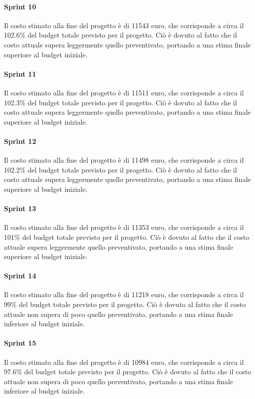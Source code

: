 \paragraph{Sprint 10}
Il costo stimato alla fine del progetto è di 11543 euro, che corrisponde a circa il 102.6\% del budget totale previsto per il progetto.
Ciò è dovuto al fatto che il costo attuale supera leggermente quello preventivato, portando a una stima finale superiore al budget iniziale.

\paragraph{Sprint 11}
Il costo stimato alla fine del progetto è di 11511 euro, che corrisponde a circa il 102.3\% del budget totale previsto per il progetto.
Ciò è dovuto al fatto che il costo attuale supera leggermente quello preventivato, portando a una stima finale superiore al budget iniziale.

\paragraph{Sprint 12}
Il costo stimato alla fine del progetto è di 11498 euro, che corrisponde a circa il 102.2\% del budget totale previsto per il progetto.
Ciò è dovuto al fatto che il costo attuale supera leggermente quello preventivato, portando a una stima finale superiore al budget iniziale.

\paragraph{Sprint 13}
Il costo stimato alla fine del progetto è di 11353 euro, che corrisponde a circa il 101\% del budget totale previsto per il progetto.
Ciò è dovuto al fatto che il costo attuale supera leggermente quello preventivato, portando a una stima finale superiore al budget iniziale.

\paragraph{Sprint 14}
Il costo stimato alla fine del progetto è di 11218 euro, che corrisponde a circa il 99\% del budget totale previsto per il progetto.
Ciò è dovuto al fatto che il costo attuale non supera di poco quello preventivato, portando a una stima finale inferiore al budget iniziale.

\paragraph{Sprint 15}
Il costo stimato alla fine del progetto è di 10984 euro, che corrisponde a circa il 97.6\% del budget totale previsto per il progetto.
Ciò è dovuto al fatto che il costo attuale non supera di poco quello preventivato, portando a una stima finale inferiore al budget iniziale.

